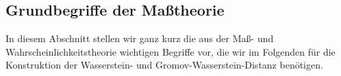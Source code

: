 \documentclass[twoside, 12pt,a4paper]{book}
\numberwithin{equation}{section}
\begin{document}
	\subsection{Grundbegriffe der Maßtheorie}
	In diesem Abschnitt stellen wir ganz kurz die aus der Maß- und Wahrscheinlichkeitstheorie wichtigen Begriffe vor, die wir im Folgenden für die Konstruktion der Wasserstein- und  Gromov-Wasserstein-Distanz benötigen.

\end{document}
